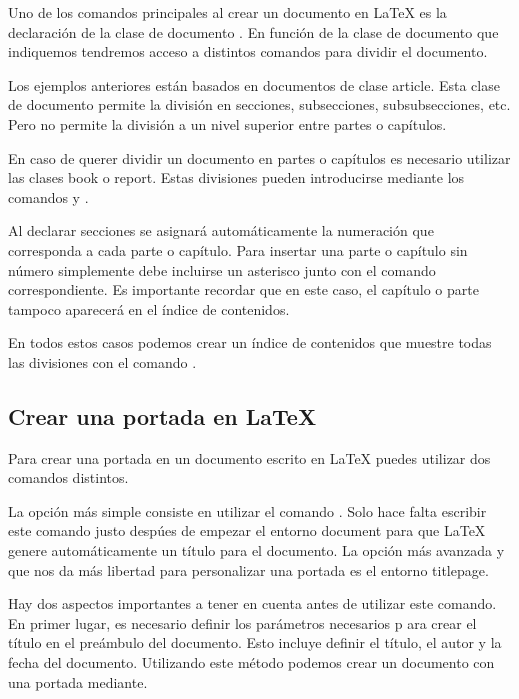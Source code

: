 \documentclass[11pt, a4paper]{article}
\begin{document}
Uno de los comandos principales al crear un documento en LaTeX es la declaración de la clase de documento . En función de la clase de documento que indiquemos tendremos acceso a distintos comandos para dividir el documento.

Los ejemplos anteriores están basados en documentos de clase article. Esta clase de documento permite la división en secciones, subsecciones, subsubsecciones, etc. Pero no permite la división a un nivel superior entre partes o capítulos.

En caso de querer dividir un documento en partes o capítulos es necesario utilizar las clases book o report. Estas divisiones pueden introducirse mediante los comandos  y .

Al declarar secciones se asignará automáticamente la numeración que corresponda a cada parte o capítulo. Para insertar una parte o capítulo sin número simplemente debe incluirse un asterisco junto con el comando correspondiente. Es importante recordar que en este caso, el capítulo o parte tampoco aparecerá en el índice de contenidos.


En todos estos casos podemos crear un índice de contenidos que muestre todas las divisiones con el comando .

\subsection{Crear una portada en LaTeX}

Para crear una portada en un documento escrito en LaTeX puedes utilizar dos comandos distintos.

La opción más simple consiste en utilizar el comando . Solo hace falta escribir este comando justo despúes de empezar el entorno document para que LaTeX genere automáticamente un título para el documento. La opción más avanzada y que nos da más libertad para personalizar una portada es el entorno titlepage.

Hay dos aspectos importantes a tener en cuenta antes de utilizar este comando. En primer lugar, es necesario definir los parámetros necesarios p ara crear el título en el preámbulo del documento. Esto incluye definir el título, el autor y la fecha del documento.
Utilizando este método podemos crear un documento con una portada mediante.

\end{document}
